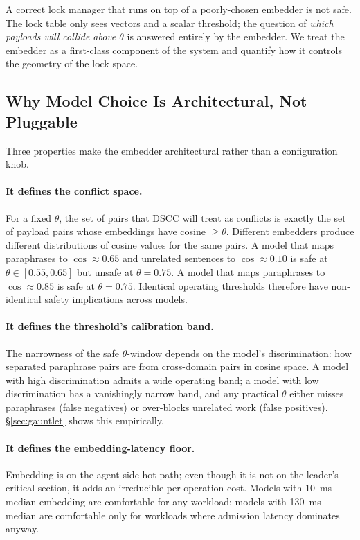 \documentclass[sigconf]{acmart}
\begin{document}
A correct lock manager that runs on top of a poorly-chosen embedder is
not safe. The lock table only sees vectors and a scalar threshold; the
question of \emph{which payloads will collide above $\theta$} is
answered entirely by the embedder. We treat the embedder as a
first-class component of the system and quantify how it controls the
geometry of the lock space.

\subsection{Why Model Choice Is Architectural, Not Pluggable}
\label{sec:emb-arch}

Three properties make the embedder architectural rather than a
configuration knob.

\paragraph{It defines the conflict space.}
For a fixed $\theta$, the set of pairs that DSCC will treat as
conflicts is exactly the set of payload pairs whose embeddings have
cosine $\ge\theta$. Different embedders produce different distributions
of cosine values for the same pairs. A model that maps paraphrases to
$\cos\approx 0.65$ and unrelated sentences to $\cos\approx 0.10$ is
safe at $\theta\in[0.55,0.65]$ but unsafe at $\theta=0.75$. A model that
maps paraphrases to $\cos\approx 0.85$ is safe at $\theta=0.75$.
Identical operating thresholds therefore have non-identical safety
implications across models.

\paragraph{It defines the threshold's calibration band.}
The narrowness of the safe $\theta$-window depends on the model's
discrimination: how separated paraphrase pairs are from cross-domain
pairs in cosine space. A model with high discrimination admits a wide
operating band; a model with low discrimination has a vanishingly
narrow band, and any practical $\theta$ either misses paraphrases
(false negatives) or over-blocks unrelated work (false positives).
\S\ref{sec:gauntlet} shows this empirically.

\paragraph{It defines the embedding-latency floor.}
Embedding is on the agent-side hot path; even though it is not on the
leader's critical section, it adds an irreducible per-operation cost.
Models with 10~ms median embedding are comfortable for any workload;
models with 130~ms median are comfortable only for workloads where
admission latency dominates anyway.
\end{document}

